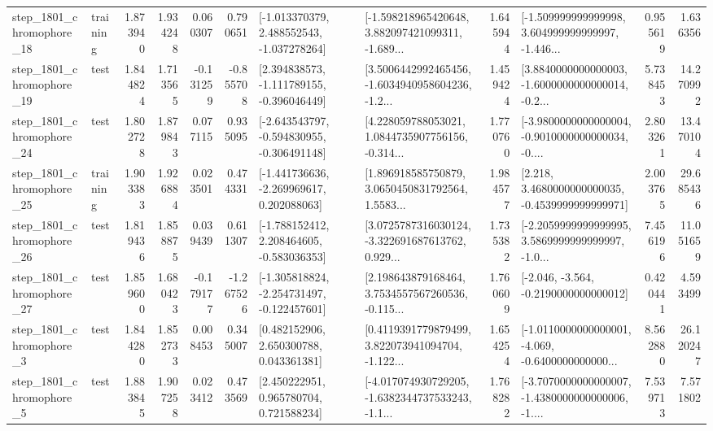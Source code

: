 \begin{tabular}{llrrrrllrlrr}
 step\_1801\_chromophore\_18 &  training &      1.873940 &    1.934248 &      0.060307 &  0.790651 &   [-1.013370379, 2.488552543, -1.037278264] &  [-1.598218965420648, 3.882097421099311, -1.689... &       1.645944 &  [-1.509999999999998, 3.604999999999997, -1.446... &            0.955619 &          1.636356 \\
 step\_1801\_chromophore\_19 &      test &      1.844824 &    1.713565 &     -0.131259 & -0.855708 &   [2.394838573, -1.111789155, -0.396046449] &  [3.5006442992465456, -1.6034940958604236, -1.2... &       1.459424 &  [3.8840000000000003, -1.6000000000000014, -0.2... &            5.738453 &         14.270992 \\
 step\_1801\_chromophore\_24 &      test &      1.802728 &    1.879843 &      0.077115 &  0.935095 &  [-2.643543797, -0.594830955, -0.306491148] &  [4.228059788053021, 1.0844735907756156, -0.314... &       1.770760 &  [-3.9800000000000004, -0.9010000000000034, -0.... &            2.803261 &         13.470104 \\
 step\_1801\_chromophore\_25 &  training &      1.903383 &    1.926884 &      0.023501 &  0.474331 &   [-1.441736636, -2.269969617, 0.202088063] &  [1.896918585750879, 3.0650450831792564, 1.5583... &       1.984577 &   [2.218, 3.4680000000000035, -0.4539999999999971] &            2.003765 &         29.685436 \\
 step\_1801\_chromophore\_26 &      test &      1.819436 &    1.858875 &      0.039439 &  0.611307 &   [-1.788152412, 2.208464605, -0.583036353] &  [3.0725787316030124, -3.322691687613762, 0.929... &       1.735382 &  [-2.2059999999999995, 3.5869999999999997, -1.0... &            7.456196 &         11.051659 \\
 step\_1801\_chromophore\_27 &      test &      1.859600 &    1.680423 &     -0.179177 & -1.267526 &  [-1.305818824, -2.254731497, -0.122457601] &  [2.198643879168464, 3.7534557567260536, -0.115... &       1.760609 &              [-2.046, -3.564, -0.2190000000000012] &            0.420441 &          4.593499 \\
  step\_1801\_chromophore\_3 &      test &      1.844280 &    1.852733 &      0.008453 &  0.345007 &     [0.482152906, 2.650300788, 0.043361381] &  [0.4119391779879499, 3.822073941094704, -1.122... &       1.654254 &  [-1.0110000000000001, -4.069, -0.6400000000000... &            8.562880 &         26.120247 \\
  step\_1801\_chromophore\_5 &      test &      1.883845 &    1.907258 &      0.023412 &  0.473569 &     [2.450222951, 0.965780704, 0.721588234] &  [-4.017074930729205, -1.6382344737533243, -1.1... &       1.768282 &  [-3.7070000000000007, -1.4380000000000006, -1.... &            7.539713 &          7.571802 \\

\end{tabular}
